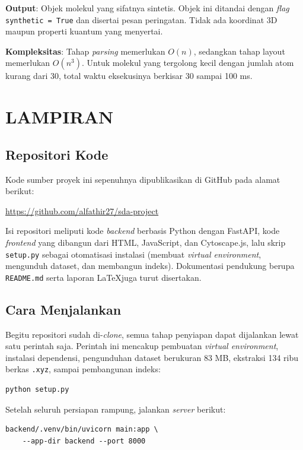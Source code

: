 \documentclass[a4paper,12pt]{report}
\begin{document}
\textbf{Output}: Objek molekul yang sifatnya sintetis. Objek ini ditandai dengan \textit{flag} \texttt{synthetic = True} dan disertai pesan peringatan. Tidak ada koordinat 3D maupun properti kuantum yang menyertai.

\textbf{Kompleksitas}: Tahap \textit{parsing} memerlukan $O(n)$, sedangkan tahap layout memerlukan $O(n^3)$. Untuk molekul yang tergolong kecil dengan jumlah atom kurang dari 30, total waktu eksekusinya berkisar 30 sampai 100 ms.

\chapter{LAMPIRAN}

\section{Repositori Kode}

Kode sumber proyek ini sepenuhnya dipublikasikan di GitHub pada alamat berikut:

\begin{center}
\url{https://github.com/alfathir27/sda-project}
\end{center}

Isi repositori meliputi kode \textit{backend} berbasis Python dengan FastAPI, kode \textit{frontend} yang dibangun dari HTML, JavaScript, dan Cytoscape.js, lalu skrip \texttt{setup.py} sebagai otomatisasi instalasi (membuat \textit{virtual environment}, mengunduh dataset, dan membangun indeks). Dokumentasi pendukung berupa \texttt{README.md} serta laporan \LaTeX juga turut disertakan.

\section{Cara Menjalankan}

Begitu repositori sudah di-\textit{clone}, semua tahap penyiapan dapat dijalankan lewat satu perintah saja. Perintah ini mencakup pembuatan \textit{virtual environment}, instalasi dependensi, pengunduhan dataset berukuran 83 MB, ekstraksi 134 ribu berkas \texttt{.xyz}, sampai pembangunan indeks:

\begin{verbatim}
python setup.py
\end{verbatim}

Setelah seluruh persiapan rampung, jalankan \textit{server} berikut:

\begin{verbatim}
backend/.venv/bin/uvicorn main:app \
    --app-dir backend --port 8000
\end{verbatim}
\end{document}
